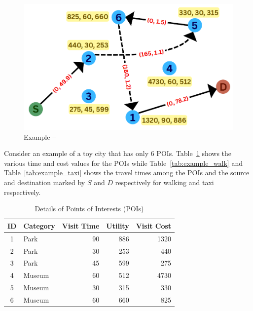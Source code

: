 \begin{figure}[t]
	\centering
	\includegraphics[width=\columnwidth]{plots/updatedExample.png}
	\caption{Example -- }
	\label{fig:example_graph}
\end{figure}

Consider an example of a toy city that has only 6 POIs.
Table~\ref{tab:example_poi} shows the various time and cost values for
the POIs while Table~\ref{tab:example_walk} and
Table~\ref{tab:example_taxi} shows the travel times among the POIs and
the source and destination marked by $S$ and $D$ respectively for
walking and taxi respectively.

\begin{table}[t]
	\centering
	\resizebox{0.85\columnwidth}{!}
	{
		\begin{tabular}{c l rrr}
			\toprule
			\textbf{ID} & \textbf{Category} & \textbf{Visit Time} & \textbf{Utility} & \textbf{Visit Cost} \\
			\midrule
			1 & Park        & 90 & 886 & 1320 \\
			2 & Park        & 30 & 253 & 440  \\
			3 & Park        & 45 & 599 & 275  \\
			4 & Museum      & 60 & 512 & 4730 \\
			5 & Museum      & 30 & 315 & 330  \\
			6 & Museum      & 60 & 660 & 825  \\
			\bottomrule
		\end{tabular}
	}
	\caption{Details of Points of Interests (POIs)}
	\label{tab:example_poi}
\end{table}

